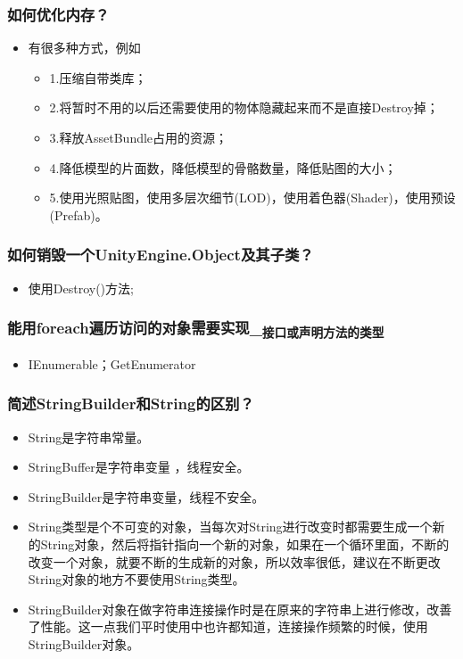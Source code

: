 \documentclass[9pt, b5paper]{article}
\begin{document}
\subsubsection{如何优化内存？}
\label{sec:org70d029f}
\begin{itemize}
\item 有很多种方式，例如
\begin{itemize}
\item 1.压缩自带类库；
\item 2.将暂时不用的以后还需要使用的物体隐藏起来而不是直接Destroy掉；
\item 3.释放AssetBundle占用的资源；
\item 4.降低模型的片面数，降低模型的骨骼数量，降低贴图的大小；
\item 5.使用光照贴图，使用多层次细节(LOD)，使用着色器(Shader)，使用预设(Prefab)。
\end{itemize}
\end{itemize}

\subsubsection{如何销毁一个UnityEngine.Object及其子类？}
\label{sec:orgd84ed78}
\begin{itemize}
\item 使用Destroy()方法;
\end{itemize}

\subsubsection{能用foreach遍历访问的对象需要实现\_\textsubscript{接口或声明}\textsubscript{方法的类型}}
\label{sec:orgc91a79c}
\begin{itemize}
\item IEnumerable；GetEnumerator
\end{itemize}
\subsubsection{简述StringBuilder和String的区别？}
\label{sec:org163dd8e}
\begin{itemize}
\item String是字符串常量。
\item StringBuffer是字符串变量 ，线程安全。
\item StringBuilder是字符串变量，线程不安全。
\item String类型是个不可变的对象，当每次对String进行改变时都需要生成一个新的String对象，然后将指针指向一个新的对象，如果在一个循环里面，不断的改变一个对象，就要不断的生成新的对象，所以效率很低，建议在不断更改String对象的地方不要使用String类型。
\item StringBuilder对象在做字符串连接操作时是在原来的字符串上进行修改，改善了性能。这一点我们平时使用中也许都知道，连接操作频繁的时候，使用StringBuilder对象。
\end{itemize}
\end{document}
